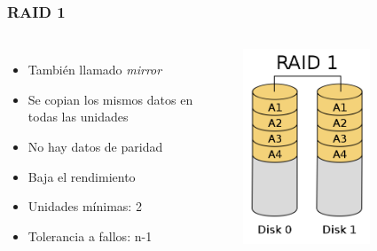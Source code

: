\documentclass[aspectratio=169]{beamer}
\begin{document}
\begin{frame}
  \frametitle{RAID 1}
  \begin{columns}
    \begin{itemize}
    \item También llamado \emph{mirror}
    \item Se copian los mismos datos en todas las unidades
    \item No hay datos de paridad
    \item Baja el rendimiento
    \item Unidades mínimas: 2
    \item Tolerancia a fallos: n-1
    \end{itemize}
    \includegraphics[width=0.6\textwidth]{img/RAID1}
  \end{columns}
  
\end{frame}
\end{document}
